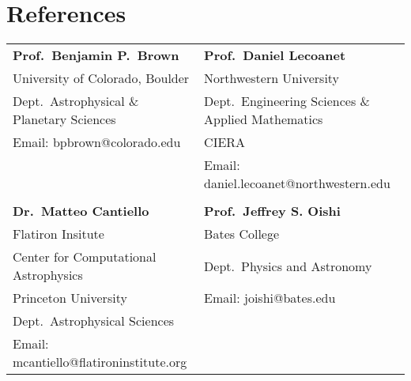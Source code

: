 \section{References}

\begin{tabular}{ll}
    \textbf{Prof.~Benjamin P.~Brown} 					    &\hspace{0.25in} \textbf{Prof.~Daniel Lecoanet}  					\\
    University of Colorado, Boulder   			            &\hspace{0.25in} Northwestern University 	\\
    \hspace{0.2in}Dept.~Astrophysical \& Planetary Sciences &\hspace{0.45in} Dept.~Engineering Sciences \& Applied Mathematics 												\\
    Email: bpbrown@colorado.edu							    &\hspace{0.45in} CIERA     						\\
													        &\hspace{0.25in} Email: daniel.lecoanet@northwestern.edu             \\
                                                    \\

     \textbf{Dr.~Matteo Cantiello}                           &\hspace{0.25in} \textbf{Prof.~Jeffrey S. Oishi}		\\
     Flatiron Insitute                                      &\hspace{0.25in} Bates College			\\
     \hspace{0.2in}Center for Computational Astrophysics    &\hspace{0.45in} Dept.~Physics and Astronomy				 			\\
     Princeton University                                   &\hspace{0.25in} Email: joishi@bates.edu 				\\
     \hspace{0.2in}Dept.~Astrophysical Sciences & \\
     Email: mcantiello@flatironinstitute.org & \\
\end{tabular}

